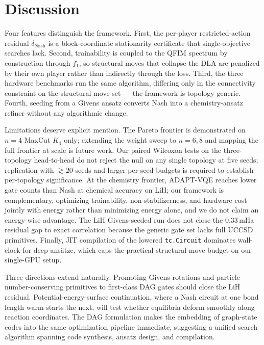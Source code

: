\documentclass[a4paper,onecolumn,noarxiv]{quantumarticle}
\begin{document}
\section{Discussion}
\label{sec:discussion}

Four features distinguish the framework. First, the per-player restricted-action residual $\delta_\text{Nash}$ is a block-coordinate stationarity certificate that single-objective searches lack. Second, trainability is coupled to the QFIM spectrum by construction through $f_1$, so structural moves that collapse the DLA are penalized by their own player rather than indirectly through the loss. Third, the three hardware benchmarks run the same algorithm, differing only in the connectivity constraint on the structural move set — the framework is topology-generic. Fourth, seeding from a Givens ansatz converts Nash into a chemistry-ansatz refiner without any algorithmic change.

Limitations deserve explicit mention. The Pareto frontier is demonstrated on $n=4$ MaxCut $K_4$ only; extending the weight sweep to $n=6,8$ and mapping the full frontier at scale is future work. Our paired Wilcoxon tests on the three-topology head-to-head do not reject the null on any single topology at five seeds; replication with $\gtrsim 20$ seeds and larger per-seed budgets is required to establish per-topology significance. At the chemistry frontier, ADAPT-VQE reaches lower gate counts than Nash at chemical accuracy on LiH; our framework is complementary, optimizing trainability, non-stabilizerness, and hardware cost jointly with energy rather than minimizing energy alone, and we do not claim an energy-wise advantage. The LiH Givens-seeded run does not close the $0.33$\,mHa residual gap to exact correlation because the generic gate set lacks full UCCSD primitives. Finally, JIT compilation of the lowered \texttt{tc.Circuit} dominates wall-clock for deep ans\"atze, which caps the practical structural-move budget on our single-GPU setup.

Three directions extend naturally. Promoting Givens rotations and particle-number-conserving primitives to first-class DAG gates should close the LiH residual. Potential-energy-surface continuation, where a Nash circuit at one bond length warm-starts the next, will test whether equilibria deform smoothly along reaction coordinates. The DAG formulation makes the embedding of graph-state codes \cite{hein2004graphstates} into the same optimization pipeline immediate, suggesting a unified search algorithm spanning code synthesis, ansatz design, and compilation.
\end{document}

